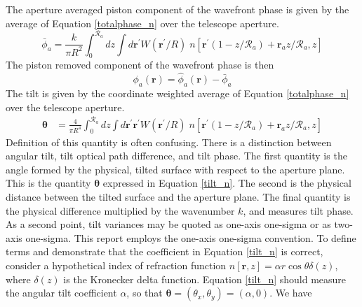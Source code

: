 The aperture averaged piston component of the wavefront phase is given by the average of
Equation \ref{totalphase_n} over the telescope aperture.
\begin{equation}\label{pistonphase_n}
\bar{\phi}_{a} = \frac{k}{\pi R^{2}} \int_{0}^{\mathcal{R}_{a}} dz 
\int d\boldsymbol{r}^{\prime} W(\boldsymbol{r}^{\prime}/R) \; n\left[\boldsymbol{r}^{\prime}\left(1-z/\mathcal{R}_{a}\right) + \boldsymbol{r}_{a} z/\mathcal{R}_{a}, z\right]
\end{equation}
The piston removed component of the wavefront phase is then
\begin{equation}\label{prphase_n}
\phi_{a}\left(\boldsymbol{r}\right) = \hat{\phi}_{a}\left(\boldsymbol{r}\right) - \bar{\phi}_{a}
\end{equation}
The tilt is given by the coordinate weighted average of Equation
\ref{totalphase_n} over the telescope aperture.
\begin{equation}\label{tilt_n}
\begin{aligned}
\boldsymbol{\theta} &= \frac{4}{\pi R^{4}} \int_{0}^{\mathcal{R}_{a}} dz 
\int d\boldsymbol{r}^{\prime} \boldsymbol{r}^{\prime} W(\boldsymbol{r}^{\prime}/R) \; n\left[\boldsymbol{r}^{\prime}\left(1-z/\mathcal{R}_{a}\right) + \boldsymbol{r}_{a} z/\mathcal{R}_{a}, z\right]
\end{aligned}
\end{equation}
Definition of this quantity is often confusing.  There is a
distinction between angular tilt, tilt optical path difference, and
tilt phase.  The first quantity is the angle formed by the physical,
tilted surface with respect to the aperture plane.  This is the
quantity $\boldsymbol{\theta}$ expressed in Equation \ref{tilt_n}.
The second is the physical distance between the tilted surface and the
aperture plane.  The final quantity is the physical difference
multiplied by the wavenumber $k$, and measures tilt phase.  As a
second point, tilt variances may be quoted as one-axis one-sigma or as
two-axis one-sigma.  This report employs the one-axis one-sigma
convention.  To define terms and demonstrate that the coefficient in
Equation \ref{tilt_n} is correct, consider a hypothetical index of
refraction function $n\left[\boldsymbol{r},z\right] = \alpha r \cos
\theta \delta\left(z\right)$, where $\delta\left(z\right)$ is the
Kronecker delta function.  Equation \ref{tilt_n} should measure the
angular tilt coefficient $\alpha$, so that $\boldsymbol{\theta} =
\left(\theta_{x}, \theta_{y}\right) = \left(\alpha, 0\right)$.  We
have
